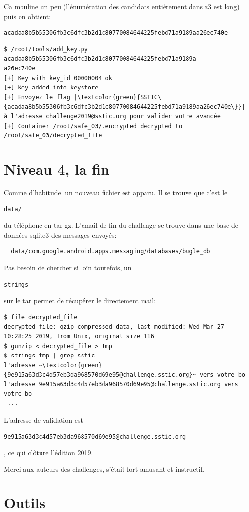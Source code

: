 \documentclass[14pt]{article}
\newcommand{\inlinebox}[2]{%
\colorbox{bg}{%
\parbox[b][0.6em]{\widthof{\texttt{#2}}}{\texttt{#2}}
}
}
\newcommand{\inlinebash}[1]{ \inlinebox{bash}{#1} }
\newcommand{\filename}[1]{ \inlinebox{bash}{#1} }
\theoremstyle{definition}
\begin{document}
Ca mouline un peu (l'énumération des candidats entièrement dans z3 est long) puis on obtient:
\begin{verbatim}
acadaa8b5b55306fb3c6dfc3b2d1c80770084644225febd71a9189aa26ec740e
\end{verbatim}

\begin{verbatim}
$ /root/tools/add_key.py acadaa8b5b55306fb3c6dfc3b2d1c80770084644225febd71a9189a
a26ec740e
[+] Key with key_id 00000004 ok
[+] Key added into keystore
[+] Envoyez le flag |\textcolor{green}{SSTIC\{acadaa8b5b55306fb3c6dfc3b2d1c80770084644225febd71a9189aa26ec740e\}}| à l'adresse challenge2019@sstic.org pour valider votre avancée
[+] Container /root/safe_03/.encrypted decrypted to /root/safe_03/decrypted_file
\end{verbatim}


\pagebreak
\section{Niveau 4, la fin}


Comme d'habitude, un nouveau fichier est apparu. Il se trouve que c'est le \filename{data/} du téléphone en tar gz.
L'email de fin du challenge se trouve dans une base de données sqlite3 des messages envoyés:
\begin{verbatim}
  data/com.google.android.apps.messaging/databases/bugle_db
\end{verbatim}


Pas besoin de chercher si loin toutefois, un \inlinebash{strings} sur le tar permet de récupérer le directement mail:


\begin{verbatim}
$ file decrypted_file
decrypted_file: gzip compressed data, last modified: Wed Mar 27 10:28:25 2019, from Unix, original size 116
$ gunzip < decrypted_file > tmp
$ strings tmp | grep sstic
l'adresse ~\textcolor{green}{9e915a63d3c4d57eb3da968570d69e95@challenge.sstic.org}~ vers votre bo
l'adresse 9e915a63d3c4d57eb3da968570d69e95@challenge.sstic.org vers votre bo
 ...
\end{verbatim}

L'adresse de validation est \filename{9e915a63d3c4d57eb3da968570d69e95@challenge.sstic.org}, ce qui clôture l'édition 2019.


Merci aux auteurs des challenges, s'était fort amusant et instructif.

\section{Outils}
\end{document}
